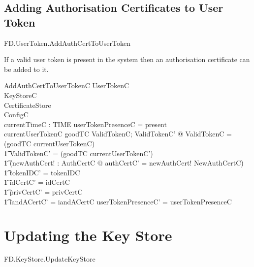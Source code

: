\subsection{Adding Authorisation Certificates to User Token}

\begin{traceunit}{FD.UserToken.AddAuthCertToUserToken}
\end{traceunit}


If a valid user token is present in the system then an authorisation
certificate can be added to it.


\begin{schema}{AddAuthCertToUserTokenC}
        \Delta UserTokenC
\\      KeyStoreC
\\      CertificateStore
\\      ConfigC
\\      currentTimeC : TIME
\where
        userTokenPresenceC = present
\\      currentUserTokenC \in \ran goodTC
\also
      \exists ValidTokenC; ValidTokenC' @ \theta ValidTokenC = (goodTC \inv
currentUserTokenC) 
\\ \t1  \land \theta ValidTokenC' = (goodTC \inv currentUserTokenC')
\\ \t1  \land (\exists newAuthCert! : AuthCertC @ \The authCertC' = newAuthCert!
        \land NewAuthCertC)
\\ \t1  \land tokenIDC' = tokenIDC
\\ \t1  \land idCertC' = idCertC
\\ \t1  \land privCertC' = privCertC
\\ \t1  \land iandACertC' = iandACertC
\also
        userTokenPresenceC' = userTokenPresenceC
\end{schema}


\section{Updating the Key Store}

\begin{traceunit}{FD.KeyStore.UpdateKeyStore}
\end{traceunit}


